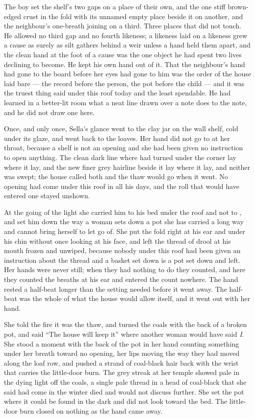 The boy set the shelf’s two gaps on a place of their own, and the one stiff brown-edged crust in the fold with its unnamed empty place beside it on another, and the neighbour’s one-breath joining on a third. Three places that did not touch. He allowed no third gap and no fourth likeness; a likeness laid on a likeness grew a cause as surely as silt gathers behind a weir unless a hand held them apart, and the clean hand at the foot of a cause was the one object he had spent two lives declining to become. He kept his own hand out of it. That the neighbour’s hand had gone to the board before her eyes had gone to him was the order of the house laid bare — the record before the person, the pot before the child — and it was the truest thing said under this roof today and the least spendable. He had learned in a better-lit room what a neat line drawn over a note does to the note, and he did not draw one here.

Once, and only once, Sella’s glance went to the clay jar on the wall shelf, cold under its glaze, and went back to the loaves. Her hand did not go to  at her throat, because a shelf is not an opening and she had been given no instruction to open anything. The clean dark line where  had turned under the corner lay where it lay, and the new finer grey hairline beside it lay where it lay, and neither was swept; the house called both  and the thaw would go when it went. No opening had come under this roof in all his days, and the roll that would have entered one stayed unshown.

At the going of the light she carried him to his bed under the roof and not to , and set him down the way a woman sets down a pot she has carried a long way and cannot bring herself to let go of. She put the fold right at his ear and under his chin without once looking at his face, and left the thread of drool at his mouth frozen and unwiped, because nobody under this roof had been given an instruction about the thread and a basket set down is a pot set down and left. Her hands were never still; when they had nothing to do they counted, and here they counted the breaths at his ear and entered the count nowhere. The hand rested a half-beat longer than the setting needed before it went away. The half-beat was the whole of what the house would allow itself, and it went out with her hand.

She told the fire it was the thaw, and turned the coals with the back of a broken pot, and said “The house will keep it” where another woman would have said \emph{I}. She stood a moment with the back of the pot in her hand counting something under her breath toward no opening, her lips moving the way they had moved along the loaf row, and pushed a strand of coal-black hair back with the wrist that carries the little-door burn. The grey streak at her temple showed pale in the dying light off the coals, a single pale thread in a head of coal-black that she said had come in the winter  died and would not discuss further. She set the pot where it could be found in the dark and did not look toward the bed. The little-door burn closed on nothing as the hand came away.


